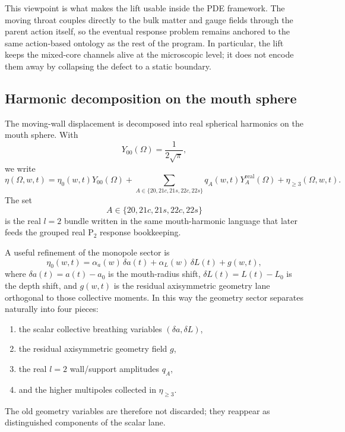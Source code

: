 \documentclass[11pt]{article}
\theoremstyle{definition}
\newcommand{\Ptwo}{\ensuremath{\mathrm{P}_2}}
\begin{document}
This viewpoint is what makes the lift usable inside the PDE framework. The moving throat couples directly to the bulk matter and gauge fields through the parent action itself, so the eventual response problem remains anchored to the same action-based ontology as the rest of the program. In particular, the lift keeps the mixed-core channels alive at the microscopic level; it does not encode them away by collapsing the defect to a static boundary.

\subsection{Harmonic decomposition on the mouth sphere}

The moving-wall displacement is decomposed into real spherical harmonics on the mouth sphere. With
\begin{equation}
Y_{00}(\Omega)=\frac{1}{2\sqrt{\pi}},
\label{eq:geometry-lift-Y00}
\end{equation}
we write
\begin{equation}
\eta(\Omega,w,t)
=
\eta_0(w,t)Y_{00}(\Omega)
+
\sum_{A\in\{20,21c,21s,22c,22s\}} q_A(w,t)Y_A^{\mathrm{real}}(\Omega)
+
\eta_{\ge 3}(\Omega,w,t).
\label{eq:geometry-lift-harmonic-decomp}
\end{equation}
The set
\[
A\in\{20,21c,21s,22c,22s\}
\]
is the real $l=2$ bundle written in the same mouth-harmonic language that later feeds the grouped real $\Ptwo$ response bookkeeping.

A useful refinement of the monopole sector is
\begin{equation}
\eta_0(w,t)
=
\alpha_a(w)\,\delta a(t)
+
\alpha_L(w)\,\delta L(t)
+
 g(w,t),
\label{eq:geometry-lift-axisymmetric-split}
\end{equation}
where $\delta a(t)=a(t)-a_0$ is the mouth-radius shift, $\delta L(t)=L(t)-L_0$ is the depth shift, and $g(w,t)$ is the residual axisymmetric geometry lane orthogonal to those collective moments. In this way the geometry sector separates naturally into four pieces:
\begin{enumerate}
    \item the scalar collective breathing variables $(\delta a,\delta L)$,
    \item the residual axisymmetric geometry field $g$,
    \item the real $l=2$ wall/support amplitudes $q_A$,
    \item and the higher multipoles collected in $\eta_{\ge 3}$.
\end{enumerate}
The old geometry variables are therefore not discarded; they reappear as distinguished components of the scalar lane.
\end{document}

